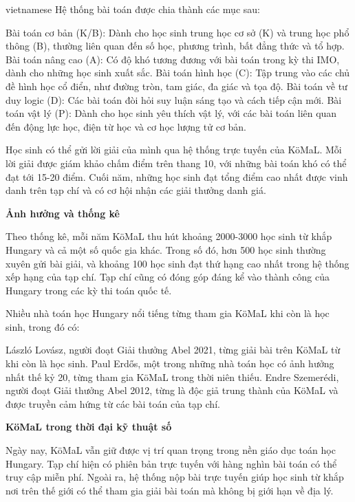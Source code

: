 \documentclass{article}
\begin{document}
\begin{otherlanguage*}{vietnamese}
Hệ thống bài toán được chia thành các mục sau:
\begin{itemize}[topsep=0pt, partopsep=0pt, itemsep=0pt]
    \ii Bài toán cơ bản (K/B): Dành cho học sinh trung học cơ sở (K) và trung học phổ thông (B), thường liên quan đến số học, phương trình, bất đẳng thức và tổ hợp.
    \ii Bài toán nâng cao (A): Có độ khó tương đương với bài toán trong kỳ thi IMO, dành cho những học sinh xuất sắc.
    \ii Bài toán hình học (C): Tập trung vào các chủ đề hình học cổ điển, như đường tròn, tam giác, đa giác và tọa độ.
    \ii Bài toán về tư duy logic (D): Các bài toán đòi hỏi suy luận sáng tạo và cách tiếp cận mới.
    \ii Bài toán vật lý (P): Dành cho học sinh yêu thích vật lý, với các bài toán liên quan đến động lực học, điện từ học và cơ học lượng tử cơ bản.
\end{itemize}

Học sinh có thể gửi lời giải của mình qua hệ thống trực tuyến của KöMaL. Mỗi lời giải được giám khảo chấm điểm trên thang 10, với những bài toán khó có thể đạt tới 15-20 điểm.
Cuối năm, những học sinh đạt tổng điểm cao nhất được vinh danh trên tạp chí và có cơ hội nhận các giải thưởng danh giá.

\textbf{Ảnh hưởng và thống kê}

Theo thống kê, mỗi năm KöMaL thu hút khoảng 2000-3000 học sinh từ khắp Hungary và cả một số quốc gia khác. Trong số đó, hơn 500 học sinh thường xuyên gửi bài giải,
và khoảng 100 học sinh đạt thứ hạng cao nhất trong hệ thống xếp hạng của tạp chí. Tạp chí cũng có đóng góp đáng kể vào thành công của Hungary trong các kỳ thi toán quốc tế.

Nhiều nhà toán học Hungary nổi tiếng từng tham gia KöMaL khi còn là học sinh, trong đó có:
\begin{itemize}[topsep=0pt, partopsep=0pt, itemsep=0pt]
    \ii László Lovász, người đoạt Giải thưởng Abel 2021, từng giải bài trên KöMaL từ khi còn là học sinh.
    \ii Paul Erdős, một trong những nhà toán học có ảnh hưởng nhất thế kỷ 20, từng tham gia KöMaL trong thời niên thiếu.
    \ii Endre Szemerédi, người đoạt Giải thưởng Abel 2012, từng là độc giả trung thành của KöMaL và được truyền cảm hứng từ các bài toán của tạp chí.
\end{itemize}

\textbf{KöMaL trong thời đại kỹ thuật số}

Ngày nay, KöMaL vẫn giữ được vị trí quan trọng trong nền giáo dục toán học Hungary. Tạp chí hiện có phiên bản trực tuyến với hàng nghìn bài toán có thể truy cập miễn phí.
Ngoài ra, hệ thống nộp bài trực tuyến giúp học sinh từ khắp nơi trên thế giới có thể tham gia giải bài toán mà không bị giới hạn về địa lý.


\end{otherlanguage*}
\end{document}
